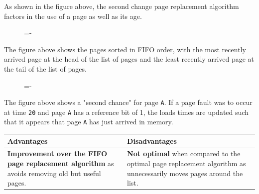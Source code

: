 \documentclass[a4paper]{systems-software}
\begin{document}
As shown in the figure above, the second change page replacement algorithm factors in the use of a page as well as its age.

\begin{figure}[H]
  \lineskip=-\fboxrule
\end{figure}

The figure above shows the pages sorted in FIFO order, with the most recently arrived page at the head of the list of pages and the least recently arrived page at the tail of the list of pages.

\begin{figure}[H]
  \lineskip=-\fboxrule
\end{figure}

The figure above shows a "second chance" for page \texttt{A}. If a page fault was to occur at time \texttt{20} and page \texttt{A} has a reference bit of 1, the loads times are updated such that it appears that page \texttt{A} has just arrived in memory.

\begin{longtabu} to \textwidth {| X[1,l] | X[1,l] |}
    \hline
    \textbf{Advantages} & \textbf{Disadvantages}
	\\ \hline
	\textbf{Improvement over the FIFO page replacement algorithm} as avoids removing old but useful pages. & \textbf{Not optimal} when compared to the optimal page replacement algorithm as unnecessarily moves pages around the list.
	\\ \hline
\end{longtabu}
\end{document}
